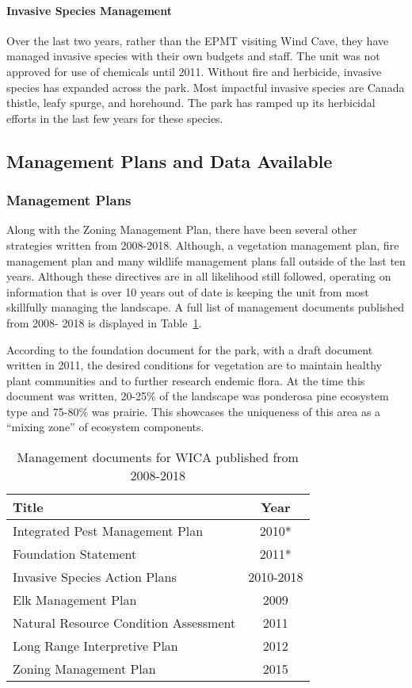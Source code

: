 \paragraph{Invasive Species Management}
Over the last two years, rather
than the EPMT visiting Wind Cave, they have managed invasive species
with their own budgets and staff. The unit was not approved for use of
chemicals until 2011. Without fire and herbicide, invasive species has
expanded across the park. Most impactful invasive species are Canada
thistle, leafy spurge, and horehound. The park has ramped up its
herbicidal efforts in the last few years for these species.

\subsection{Management Plans and Data Available}

\subsubsection{Management Plans}

Along with the Zoning Management Plan, there have been several other
strategies written from 2008-2018. Although, a vegetation management
plan, fire management plan and many wildlife management plans fall
outside of the last ten years. Although these directives are in all
likelihood still followed, operating on information that is over 10
years out of date is keeping the unit from most skillfully managing the
landscape. A full list of management documents published from 2008- 2018
is displayed in Table~\ref{tab:WICAmandocs}.

According to the foundation document for the park, with a draft document
written in 2011, the desired conditions for vegetation are to maintain
healthy plant communities and to further research endemic flora. At the
time this document was written, 20-25\% of the landscape was ponderosa
pine ecosystem type and 75-80\% was prairie. This showcases the
uniqueness of this area as a ``mixing zone'' of ecosystem components.

\begin{table}[h]
	\centering
\caption[WICA Management documents]
	{Management documents for WICA published from 2008-2018}
\label{tab:WICAmandocs}
\begin{tabular}{lc}
	\toprule
	Title & Year\tabularnewline
	\midrule
Integrated Pest Management Plan & 2010* \tabularnewline
Foundation Statement & 2011* \tabularnewline
Invasive Species Action Plans & 2010-2018 \tabularnewline
Elk Management Plan & 2009 \tabularnewline
Natural Resource Condition Assessment & 2011 \tabularnewline
Long Range Interpretive Plan & 2012 \tabularnewline
Zoning Management Plan & 2015 \tabularnewline
\bottomrule
\end{tabular}
\end{table}

